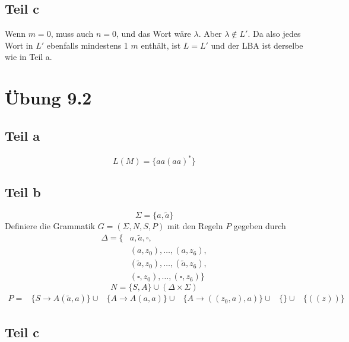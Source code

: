\documentclass[10pt,a4paper]{article}
\begin{document}
\subsection{Teil c}

Wenn $m = 0$, muss auch $n = 0$, und das Wort wäre $\lambda$.
Aber $\lambda \not\in L'$.
Da also jedes Wort in $L'$ ebenfalls mindestens 1 $m$ enthält, ist $L = L'$ und der LBA ist derselbe wie in Teil a.

\section{Übung 9.2}

\subsection{Teil a}

\begin{equation}
  L(M) = \{ aa(aa)^{*} \}
\end{equation}

\subsection{Teil b}

\begin{equation}
  \Sigma = \{ a, \tilde{a} \}
\end{equation}
Definiere die Grammatik $G = (\Sigma, N, S, P)$ mit den Regeln $P$ gegeben durch
\begin{align*}
  \Delta = \{ & a, \tilde{a}, \square,\\
  & (a, z_{0}), \dots, (a, z_{6}),\\
  & (\tilde{a}, z_{0}), \dots, (\tilde{a}, z_{6}),\\
  & (\square, z_{0}), \dots, (\square, z_{6}) \}
\end{align*}
\begin{equation}
  N = \{ S, A \} \cup (\Delta \times \Sigma)
\end{equation}
\begin{align*}
  P = & \{ S \rightarrow A(\tilde{a}, a) \} \cup
  & \{ A \rightarrow A(a, a) \} \cup
  & \{ A \rightarrow ((z_{0}, a), a) \} \cup
  & \{  \} \cup
  & \{ ((z_{})) \}
\end{align*}

\subsection{Teil c}
\end{document}
